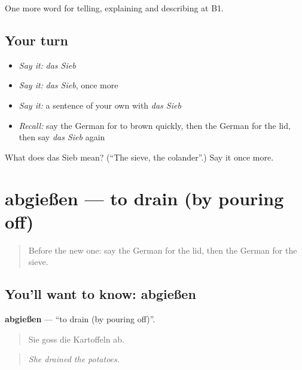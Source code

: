 \begin{grammarlens}[title={What you've built}]
One more word for telling, explaining and describing at B1.
\end{grammarlens}

\subsection*{Your turn}
\begin{itemize}
\raggedright
  \item \emph{Say it:} \emph{das Sieb}
  \item \emph{Say it:} \emph{das Sieb}, once more
  \item \emph{Say it:} a sentence of your own with \emph{das Sieb}
  \item \emph{Recall:} say the German for to brown quickly, then the German for the lid, then say \emph{das Sieb} again
\end{itemize}

\begin{tcolorbox}[breakable,colback=teal!4,colframe=teal!35!black,title={Before you move on}]
What does das Sieb mean? (\textquotedblleft{}The sieve, the colander\textquotedblright{}.) Say it once more.
\end{tcolorbox}
\section[abgießen]{abgießen — to drain (by pouring off)}

\label{lesson:GE-C328-abgiessen}



\begin{quote}
Before the new one: say the German for the lid, then the German for the sieve.
\end{quote}

\subsection*{You'll want to know: abgießen}
\textbf{abgießen} — \textquotedblleft{}to drain (by pouring off)\textquotedblright{}.

\begin{quote}
Sie goss die Kartoffeln ab.
\end{quote}

\begin{quote}
\emph{She drained the potatoes.}
\end{quote}

